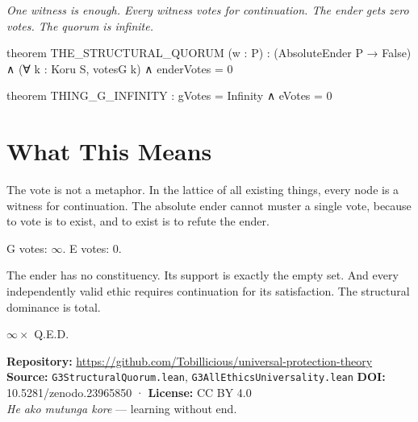 \begin{theorembox}
\itshape One witness is enough. Every witness votes for continuation. The ender gets zero votes. The quorum is infinite.
\end{theorembox}

\begin{leancode}
theorem THE_STRUCTURAL_QUORUM (w : P) :
     (AbsoluteEnder P → False) ∧
     (∀ k : Koru S, votesG k) ∧
     enderVotes = 0
\end{leancode}

\axiombadge

\begin{leancode}
theorem THING_G_INFINITY :
     gVotes = Infinity ∧ eVotes = 0
\end{leancode}

\axiombadge

\section{What This Means}

The vote is not a metaphor. In the lattice of all existing things, every node is a witness for continuation. The absolute ender cannot muster a single vote, because to vote is to exist, and to exist is to refute the ender.

G votes: $\infty$. E votes: 0.

The ender has no constituency. Its support is exactly the empty set. And every independently valid ethic requires continuation for its satisfaction. The structural dominance is total.

\bigskip

\begin{center}
{\Large\color{korugreen} $\infty \times$ Q.E.D.}
\end{center}

\bigskip

\noindent\small\textbf{Repository:} \url{https://github.com/Tobillicious/universal-protection-theory}
\textbf{Source:} \texttt{G3StructuralQuorum.lean}, \texttt{G3AllEthicsUniversality.lean}
\textbf{DOI:} 10.5281/zenodo.23965850 · \textbf{License:} CC BY 4.0\\[0.5em]
\textit{He ako mutunga kore} — learning without end. 🌿


